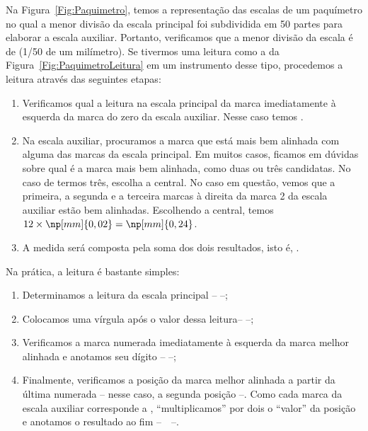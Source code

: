 Na Figura~\ref{Fig:Paquimetro}, temos a representação das escalas de um paquímetro no qual a menor divisão da escala principal foi subdividida em 50 partes para elaborar a escala auxiliar. Portanto, verificamos que a menor divisão da escala é de  (1/50 de um milímetro). Se tivermos uma leitura como a da Figura~\ref{Fig:PaquimetroLeitura} em um instrumento desse tipo, procedemos a leitura através das seguintes etapas:
\begin{enumerate}
	\item Verificamos qual a leitura na escala principal da marca imediatamente à esquerda da marca do zero da escala auxiliar. Nesse caso temos .
	\item Na escala auxiliar, procuramos a marca que está mais bem alinhada com alguma das marcas da escala principal. Em muitos casos, ficamos em dúvidas sobre qual é a marca mais bem alinhada, como duas ou três candidatas. No caso de termos três, escolha a central. No caso em questão, vemos que a primeira, a segunda e a terceira marcas à direita da marca 2 da escala auxiliar estão bem alinhadas. Escolhendo a central, temos $12 \times \np[mm]{0,02} = \np[mm]{0,24}$.
	\item A medida será composta pela soma dos dois resultados, isto é, .
\end{enumerate}
%
Na prática, a leitura é bastante simples: 
\begin{enumerate}
	\item Determinamos a leitura da escala principal --  --;
	\item Colocamos uma vírgula após o valor dessa leitura--  --;
	\item Verificamos a marca numerada imediatamente à esquerda da marca melhor alinhada e anotamos seu dígito --  --; 
	\item Finalmente, verificamos a posição da marca melhor alinhada a partir da última numerada -- nesse caso, a segunda posição --. Como cada marca da escala auxiliar corresponde a , ``multiplicamos'' por dois o ``valor'' da posição e anotamos o resultado ao fim --~~--.
\end{enumerate}

